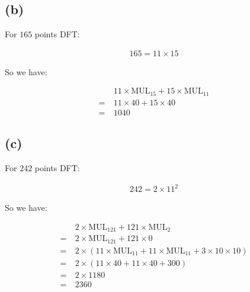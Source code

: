 \documentclass{article}
\begin{document}
\subsection*{(b)}

For $165$ points DFT:

\begin{align*}
    165 = 11 \times 15
\end{align*}

So we have:

\begin{align*}
    &11 \times \text{MUL}_{15} + 15 \times \text{MUL}_{11} \\
    = \ & 11 \times 40 + 15 \times 40 \\
    = \ & 1040
\end{align*}

\subsection*{(c)}

For $242$ points DFT:

\begin{align*}
    242 = 2 \times 11^2
\end{align*}

So we have:

\begin{align*}
    & 2 \times \text{MUL}_{121} + 121 \times \text{MUL}_{2} \\
    = \ & 2 \times \text{MUL}_{121} + 121 \times 0 \\
    = \ & 2 \times (11 \times \text{MUL}_{11} + 11 \times \text{MUL}_{11} + 3 \times 10 \times 10) \\
    = \ & 2 \times (11 \times 40 + 11 \times 40 + 300) \\
    = \ & 2 \times 1180 \\
    = \ & 2360
\end{align*}
\end{document}
